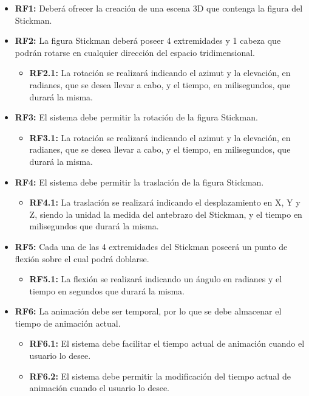 \documentclass[11pt,a4paper]{report}
\begin{document}
\begin{itemize}
\item \textbf{RF1:} Deberá ofrecer la creación de una escena 3D que contenga la figura del Stickman.
\item \textbf{RF2:} La figura Stickman deberá poseer 4 extremidades y 1 cabeza que podrán rotarse en cualquier dirección del espacio tridimensional.
  \begin{itemize}
  \item \textbf{RF2.1:} La rotación se realizará indicando el azimut y la elevación, en radianes, que se desea llevar a cabo, y el tiempo, en milisegundos,
			que durará la misma.
  \end{itemize}
\item \textbf{RF3:} El sistema debe permitir la rotación de la figura Stickman.
  \begin{itemize}
  \item \textbf{RF3.1:} La rotación se realizará indicando el azimut y la elevación, en radianes, que se desea llevar a cabo, y el tiempo, en milisegundos,
			que durará la misma.
  \end{itemize}
\item \textbf{RF4:} El sistema debe permitir la traslación de la figura Stickman.
  \begin{itemize}
  \item \textbf{RF4.1:} La traslación se realizará indicando el desplazamiento en X, Y y Z, siendo la unidad la medida del antebrazo del Stickman, y el
			tiempo en milisegundos que durará la misma.
  \end{itemize}
\item \textbf{RF5:} Cada una de las 4 extremidades del Stickman poseerá un punto de flexión sobre el cual podrá doblarse.
  \begin{itemize}
  \item \textbf{RF5.1:} La flexión se realizará indicando un ángulo en radianes y el tiempo en segundos que durará la misma.
  \end{itemize}
\item \textbf{RF6:} La animación debe ser temporal, por lo que se debe almacenar el tiempo de animación actual.
  \begin{itemize}
  \item \textbf{RF6.1:} El sistema debe facilitar el tiempo actual de animación cuando el usuario lo desee.
  \item \textbf{RF6.2:} El sistema debe permitir la modificación del tiempo actual de animación cuando el usuario lo desee.
  \end{itemize}
\end{itemize}
\end{document}
